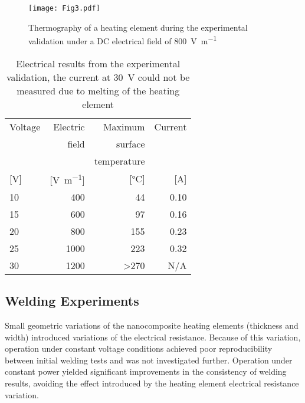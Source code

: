 \begin{figure}[htb]
	\centering
	\texttt{[image: Fig3.pdf]}
	\caption{Thermography of a heating element during the experimental validation under a DC electrical field of \SI{800}{\volt\per\metre} \cite{Brassard2018_figshare_article1}}
	\label{fig:results_lab}
\end{figure}

\begin{table}[htb]
	\centering
	\caption{Electrical results from the experimental validation, the current at \SI{30}{\volt} could not be measured due to melting of the heating element}
	\begin{tabular}{@{}lrrr@{}}
		\toprule
		Voltage 				& Electric							& Maximum  				& Current\\ 
		& field								& surface 				& \\ 
		& 										& temperature 			& \\
		{[}\si{\volt}{]} 	& {[}\si{\volt\per\metre}{]} 	& {[}\si{\celsius}{]}	& {[}\si{\ampere}{]}\\ \midrule
		10 						& 400									& 44 						& 0.10 \\
		15						& 600									& 97 						& 0.16 \\
		20 						& 800									& 155 						& 0.23 \\
		25 						& 1000									& 223 						& 0.32 \\
		30 						& 1200									& \textgreater 270 	& N/A \\ \bottomrule
	\end{tabular}
	
	\label{tab:results_lab}
\end{table}

\FloatBarrier
\subsection{Welding Experiments}

Small geometric variations of the nanocomposite heating elements (thickness and width) introduced variations of the electrical resistance. 
Because of this variation, operation under constant voltage conditions achieved poor reproducibility between initial welding tests and was not investigated further. 
Operation under constant power yielded significant improvements in the consistency of welding results, avoiding the effect introduced by the heating element electrical resistance variation. 

